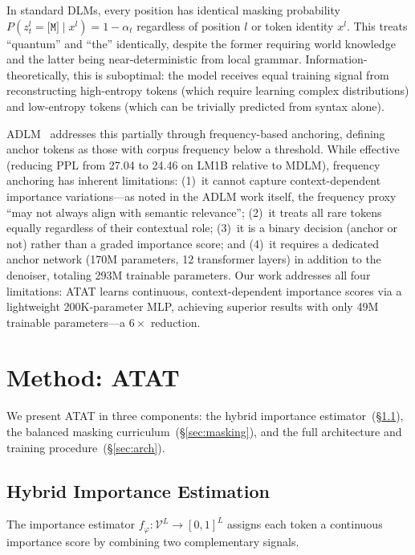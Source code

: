 \documentclass[11pt]{article}
\newcommand{\gV}{\mathcal{V}}
\theoremstyle{remark}
\begin{document}
In standard DLMs, every position has identical masking probability $P(z_t^l = \texttt{[M]} \mid x^l) = 1 - \alpha_t$ regardless of position $l$ or token identity $x^l$. This treats ``quantum'' and ``the'' identically, despite the former requiring world knowledge and the latter being near-deterministic from local grammar. Information-theoretically, this is suboptimal: the model receives equal training signal from reconstructing high-entropy tokens (which require learning complex distributions) and low-entropy tokens (which can be trivially predicted from syntax alone).

ADLM~\citep{adlm} addresses this partially through frequency-based anchoring, defining anchor tokens as those with corpus frequency below a threshold. While effective (reducing PPL from 27.04 to 24.46 on LM1B relative to MDLM), frequency anchoring has inherent limitations: (1)~it cannot capture context-dependent importance variations---as noted in the ADLM work itself, the frequency proxy ``may not always align with semantic relevance''; (2)~it treats all rare tokens equally regardless of their contextual role; (3)~it is a binary decision (anchor or not) rather than a graded importance score; and (4)~it requires a dedicated anchor network (170M parameters, 12 transformer layers) in addition to the denoiser, totaling 293M trainable parameters. Our work addresses all four limitations: ATAT learns continuous, context-dependent importance scores via a lightweight 200K-parameter MLP, achieving superior results with only 49M trainable parameters---a $6\times$ reduction.

\section{Method: ATAT}
\label{sec:method}

We present ATAT in three components: the hybrid importance estimator~(\S\ref{sec:importance}), the balanced masking curriculum~(\S\ref{sec:masking}), and the full architecture and training procedure~(\S\ref{sec:arch}).

\subsection{Hybrid Importance Estimation}
\label{sec:importance}

The importance estimator $f_\varphi: \gV^L \to [0,1]^L$ assigns each token a continuous importance score by combining two complementary signals.
\end{document}
